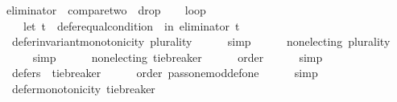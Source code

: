 \begin{isabellebody}
\ {\isacharquery}{\kern0pt}eliminator\ {\isacharequal}{\kern0pt}\ {\isachardoublequoteopen}{\isacharquery}{\kern0pt}compare{\isacharunderscore}{\kern0pt}two\ {\isasymparallel}\isactrlsub {\isasymup}\ {\isacharquery}{\kern0pt}drop{}{\isachardoublequoteclose}\isanewline
\ \ \isamarkupfalse%
\ {\isacharquery}{\kern0pt}loop\ {\isacharequal}{\kern0pt}\isanewline
\ \ \ \ {\isachardoublequoteopen}let\ t\ {\isacharequal}{\kern0pt}\ defer{\isacharunderscore}{\kern0pt}equal{\isacharunderscore}{\kern0pt}condition\ {}\ in\ {\isacharparenleft}{\kern0pt}{\isacharquery}{\kern0pt}eliminator\ {\isasymcirclearrowleft}\isactrlsub t{\isacharparenright}{\kern0pt}{\isachardoublequoteclose}\isanewline
\isanewline
\ \ \isamarkupfalse%
\ {}{}{}{}{}{\isacharcolon}{\kern0pt}\ {\isachardoublequoteopen}defer{\isacharunderscore}{\kern0pt}invariant{\isacharunderscore}{\kern0pt}monotonicity\ {\isacharparenleft}{\kern0pt}plurality{\isasymdown}{\isacharparenright}{\kern0pt}{\isachardoublequoteclose}\isanewline
\ \ \ \ \isamarkupfalse%
\ simp\ \isanewline
\ \ \isamarkupfalse%
\ {}{}{}{}{}{\isacharcolon}{\kern0pt}\ {\isachardoublequoteopen}non{\isacharunderscore}{\kern0pt}electing\ {\isacharparenleft}{\kern0pt}plurality{\isasymdown}{\isacharparenright}{\kern0pt}{\isachardoublequoteclose}\isanewline
\ \ \ \ \isamarkupfalse%
\ simp\ \isanewline
\ \ \isamarkupfalse%
\ {}{}{}{}{}{\isacharcolon}{\kern0pt}\ {\isachardoublequoteopen}non{\isacharunderscore}{\kern0pt}electing\ {\isacharquery}{\kern0pt}tie{\isacharunderscore}{\kern0pt}breaker{\isachardoublequoteclose}\isanewline
\ \ \ \ \isamarkupfalse%
\ order\isanewline
\ \ \ \ \isamarkupfalse%
\ simp\ \isanewline
\ \ \isamarkupfalse%
\ {}{}{}{}{}{\isacharcolon}{\kern0pt}\ {\isachardoublequoteopen}defers\ {}\ {\isacharquery}{\kern0pt}tie{\isacharunderscore}{\kern0pt}breaker{\isachardoublequoteclose}\isanewline
\ \ \ \ \isamarkupfalse%
\ order\ pass{\isacharunderscore}{\kern0pt}one{\isacharunderscore}{\kern0pt}mod{\isacharunderscore}{\kern0pt}def{\isacharunderscore}{\kern0pt}one\isanewline
\ \ \ \ \isamarkupfalse%
\ simp\isanewline
\ \ \isamarkupfalse%
\ {}{}{}{}{}{\isacharcolon}{\kern0pt}\ {\isachardoublequoteopen}defer{\isacharunderscore}{\kern0pt}monotonicity\ {\isacharquery}{\kern0pt}tie{\isacharunderscore}{\kern0pt}breaker{\isachardoublequoteclose}\isanewline

\end{isabellebody}
